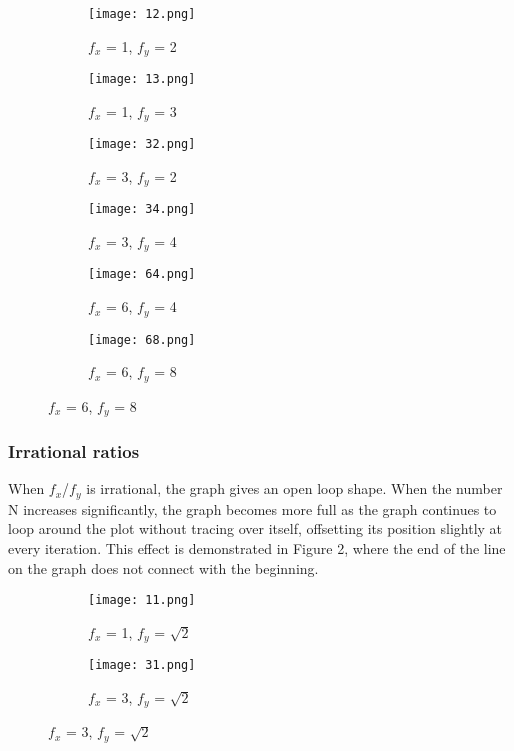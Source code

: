 \documentclass{article}
\begin{document}
\begin{figure}
    \caption{Rational $f_x$/$f_y$ values}
    \label{Rationals}


\begin{subfigure}{0.5\textwidth}
    \centering
    \texttt{[image: 12.png]}
    \caption{$f_x$ = 1, $f_y$ = 2}
    \label{12}
\end{subfigure}
\begin{subfigure}{0.5\textwidth}
    \centering
    \texttt{[image: 13.png]}
    \caption{$f_x$ = 1, $f_y$ = 3}
    \label{13}
\end{subfigure}
\begin{subfigure}{0.5\textwidth}
    \centering
    \texttt{[image: 32.png]}
    \caption{$f_x$ = 3, $f_y$ = 2}
    \label{32}
\end{subfigure}  
\begin{subfigure}{0.5\textwidth}
    \centering
    \texttt{[image: 34.png]}
    \caption{$f_x$ = 3, $f_y$ = 4}
    \label{34}
\end{subfigure}
\begin{subfigure}{0.5\textwidth}
    \centering
    \texttt{[image: 64.png]}
    \caption{$f_x$ = 6, $f_y$ = 4}
    \label{64}
\end{subfigure}  
\begin{subfigure}{0.5\textwidth}
    \centering
    \texttt{[image: 68.png]}
    \caption{$f_x$ = 6, $f_y$ = 8}
    \label{68}
\end{subfigure}

\end{figure}

\subsubsection{Irrational ratios}

When $f_x$/$f_y$ is irrational, the graph gives an open loop shape. When the number N increases significantly, the graph becomes more full as the graph continues to loop around the plot without tracing over itself, offsetting its position slightly at every iteration.  This effect is demonstrated in Figure 2, where the end of the line on the graph does not connect with the beginning. 

\begin{figure}
    \caption{Irrational $f_x$/$f_y$ values}
    \label{Irrationals}

\begin{subfigure}{0.5\textwidth}
    \centering
    \texttt{[image: 11.png]}
    \caption{$f_x$ = 1, $f_y$ =  $\sqrt{2}$}
    \label{1rt2}
\end{subfigure}
\begin{subfigure}{0.5\textwidth}
    \centering
    \texttt{[image: 31.png]}
    \caption{$f_x$ = 3, $f_y$ =  $\sqrt{2}$}
    \label{3rt2}
\end{subfigure}

\end{figure}
\end{document}
